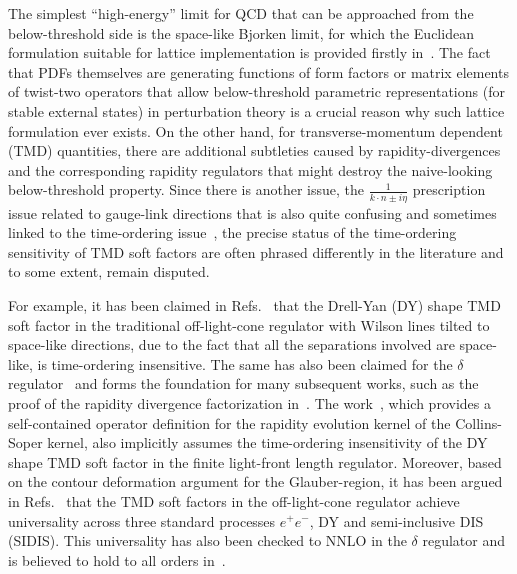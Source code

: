 \documentclass[a4paper,11pt]{article}
\begin{document}
The simplest ``high-energy'' limit for QCD that can be approached from the below-threshold side is the space-like Bjorken limit, for which the Euclidean formulation suitable for lattice implementation is provided firstly in~\cite{Ji:2013dva,Ji:2014gla}. The fact that PDFs themselves are generating functions of form factors or matrix elements of twist-two operators that allow below-threshold parametric representations (for stable external states) in perturbation theory is a crucial reason why such lattice formulation ever exists. On the other hand, for transverse-momentum dependent (TMD) quantities, there are additional subtleties caused by rapidity-divergences and the corresponding rapidity regulators that might destroy the naive-looking below-threshold property. Since there is another issue, the $\frac{1}{k\cdot n\pm i\eta}$ prescription issue related to gauge-link directions that is also quite confusing and sometimes linked to the time-ordering issue~\cite{Moult:2018jzp}, the precise status of the time-ordering sensitivity of TMD soft factors are often phrased differently in the literature and to some extent, remain disputed.  

For example, it has been claimed 
in Refs.~\cite{Collins:2004nx,Collins:2011zzd}
 that the Drell-Yan (DY) shape TMD soft factor in the traditional off-light-cone regulator with Wilson lines tilted to space-like directions, due to the fact that all the separations involved are space-like, is time-ordering insensitive. The same has also been claimed for the $\delta$ regulator~\cite{Echevarria:2015usa,Echevarria:2015byo} and forms the foundation for many subsequent works, such as the proof of the rapidity divergence factorization in~\cite{Vladimirov:2016qkd,Vladimirov:2017ksc}. The work~\cite{Vladimirov:2020umg}, which provides a self-contained operator definition for the rapidity evolution kernel of the Collins-Soper kernel, also implicitly assumes the time-ordering insensitivity of the DY shape TMD soft factor in the finite light-front length regulator. Moreover, based on the
contour deformation argument for the Glauber-region, it has been argued in Refs.~\cite{Collins:2004nx,Collins:2011zzd} that the TMD soft factors in the off-light-cone regulator achieve universality across three standard processes $e^+e^-$, DY and semi-inclusive DIS (SIDIS). This universality has also been checked to NNLO in the $\delta$ regulator and is believed to hold to all orders in~\cite{Vladimirov:2017ksc}.
\end{document}
